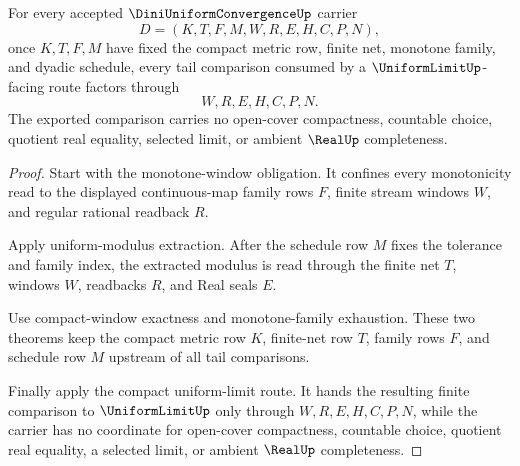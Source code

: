\begin{theorem}
\label{thm:diniuniformconvergence-finite-net-monotone-tail-scope}
For every accepted $\DiniUniformConvergenceUp$ carrier
$$
D=(K,T,F,M,W,R,E,H,C,P,N),
$$
once $K,T,F,M$ have fixed the compact metric row, finite net, monotone family, and dyadic schedule, every tail comparison consumed by a $\UniformLimitUp$-facing route factors through
$$
W,R,E,H,C,P,N .
$$
The exported comparison carries no open-cover compactness, countable choice, quotient real equality, selected limit, or ambient $\RealUp$ completeness.
\end{theorem}
\begin{proof}
Start with the monotone-window obligation. It confines every monotonicity read to the displayed continuous-map family rows $F$, finite stream windows $W$, and regular rational readback $R$.

Apply uniform-modulus extraction. After the schedule row $M$ fixes the tolerance and family index, the extracted modulus is read through the finite net $T$, windows $W$, readbacks $R$, and Real seals $E$.

Use compact-window exactness and monotone-family exhaustion. These two theorems keep the compact metric row $K$, finite-net row $T$, family rows $F$, and schedule row $M$ upstream of all tail comparisons.

Finally apply the compact uniform-limit route. It hands the resulting finite comparison to $\UniformLimitUp$ only through $W,R,E,H,C,P,N$, while the carrier has no coordinate for open-cover compactness, countable choice, quotient real equality, a selected limit, or ambient $\RealUp$ completeness.
\end{proof}

